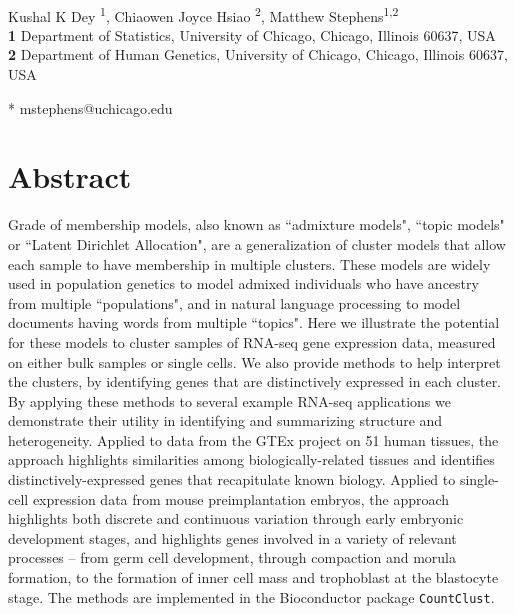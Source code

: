 \documentclass[10pt,letterpaper]{article}
\begin{document}
\vspace*{0.2in}

\begin{flushleft}
{\Large
\textbf{}
}
\newline
\\
Kushal K Dey \textsuperscript{1},
Chiaowen Joyce Hsiao \textsuperscript{2},
Matthew Stephens\textsuperscript{1,2}
\\
\bigskip
\textbf{1} Department of Statistics, University of Chicago, Chicago, Illinois 60637, USA
\\
\textbf{2} Department of Human Genetics, University of Chicago, Chicago, Illinois 60637, USA
\\
\bigskip


* mstephens@uchicago.edu

\end{flushleft}
\section*{Abstract}
Grade of membership models, also known as ``admixture models", ``topic models" or ``Latent Dirichlet Allocation",
are a generalization of cluster models that allow each sample to have membership in multiple clusters.
These models are widely used in population genetics to model admixed individuals who have ancestry from multiple ``populations",
and in natural language processing to model documents having words from multiple ``topics". Here we illustrate the potential for these models
to cluster samples of RNA-seq gene expression data, measured on either bulk samples or single cells.
We also provide methods to help interpret the clusters, by identifying genes that are distinctively expressed in each cluster.
By applying these methods to several example RNA-seq applications we demonstrate their utility in
identifying and summarizing structure and heterogeneity. Applied to
data from the GTEx project on 51 human tissues, the approach highlights similarities among biologically-related tissues and
identifies distinctively-expressed genes that recapitulate known biology.  Applied to single-cell expression data from
mouse preimplantation embryos, the approach highlights both discrete and continuous variation through early embryonic development stages,
and highlights genes involved in a variety of relevant processes -- from germ cell development, through compaction and morula formation, to
the formation of inner cell mass and trophoblast at the blastocyte stage.
The methods are implemented in the Bioconductor package {\tt CountClust}.
\end{document}
